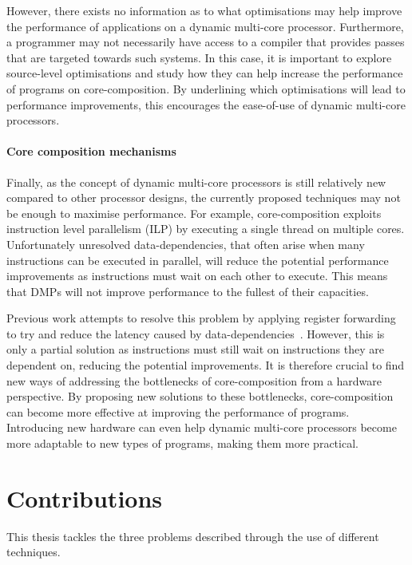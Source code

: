 However, there exists no information as to what optimisations may help improve the performance of applications on a dynamic multi-core processor.
Furthermore, a programmer may not necessarily have access to a compiler that provides passes that are targeted towards such systems.
In this case, it is important to explore source-level optimisations and study how they can help increase the performance of programs on core-composition.
By underlining which optimisations will lead to performance improvements, this encourages the ease-of-use of dynamic multi-core processors.
\vspace{-1em}
\paragraph*{Core composition mechanisms} 
Finally, as the concept of dynamic multi-core processors is still relatively new compared to other processor designs, the currently proposed techniques may not be enough to maximise performance.
For example, core-composition exploits instruction level parallelism (ILP) by executing a single thread on multiple cores.
Unfortunately unresolved data-dependencies, that often arise when many instructions can be executed in parallel, will reduce the potential performance improvements as instructions must wait on each other to execute.
This means that DMPs will not improve performance to the fullest of their capacities.

Previous work attempts to resolve this problem by applying register forwarding to try and reduce the latency caused by data-dependencies~\cite{robatmili2011uniproc}.
However, this is only a partial solution as instructions must still wait on instructions they are dependent on, reducing the potential improvements. 
It is therefore crucial to find new ways of addressing the bottlenecks of core-composition from a hardware perspective.
By proposing new solutions to these bottlenecks, core-composition can become more effective at improving the performance of programs.
Introducing new hardware can even help dynamic multi-core processors become more adaptable to new types of programs, making them more practical.

\vspace{-1em}
\section{Contributions}
This thesis tackles the three problems described through the use of different techniques.

